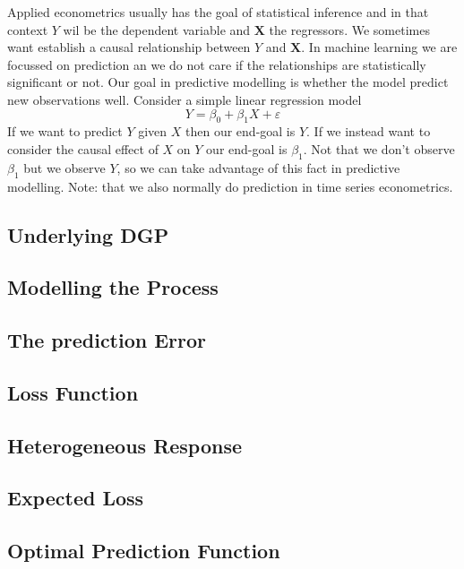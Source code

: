 \documentclass[11pt,a4paper]{article}
\begin{document}
Applied econometrics usually has the goal  of statistical inference and in that context $Y$ wil be the dependent variable and $\mathbf{X}$ the regressors. 
We sometimes want establish a causal relationship between $Y$ and $\mathbf{X}$. 
In machine learning we are focussed on prediction an we do not care if the relationships are statistically significant or not.
Our goal in predictive modelling is whether the model predict new observations well. 
\newline
Consider a simple linear regression model
\begin{equation}
    Y=\beta_{0}+\beta_{1} X+\varepsilon
 \end{equation}
If we want to predict $Y$ given $X$ then our end-goal is $Y$.
If we instead want to consider the causal effect of $X$ on $Y$ our end-goal is $\beta_1$. Not that we don't observe $\beta_1$ but we observe $Y$, so we can take advantage of this fact in predictive modelling.
Note: that we also normally do prediction in time series econometrics.

\subsection{Underlying DGP}

\subsection{Modelling the Process}

\subsection{The prediction Error}

\subsection{Loss Function}

\subsection{Heterogeneous Response}

\subsection{Expected Loss}

\subsection{Optimal Prediction Function}
\end{document}
